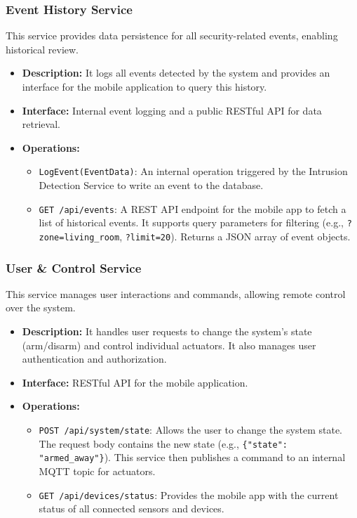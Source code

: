 \documentclass[conference]{IEEEtran}
\begin{document}
\subsubsection{Event History Service}
This service provides data persistence for all security-related events, enabling historical review.
\begin{itemize}
    \item \textbf{Description:} It logs all events detected by the system and provides an interface for the mobile application to query this history.
    \item \textbf{Interface:} Internal event logging and a public RESTful API for data retrieval.
    \item \textbf{Operations:}
    \begin{itemize}
        \item \texttt{LogEvent(EventData)}: An internal operation triggered by the Intrusion Detection Service to write an event to the database.
        \item \texttt{GET /api/events}: A REST API endpoint for the mobile app to fetch a list of historical events. It supports query parameters for filtering (e.g., \texttt{?zone=living\_room}, \texttt{?limit=20}). Returns a JSON array of event objects.
    \end{itemize}
\end{itemize}

\subsubsection{User \& Control Service}
This service manages user interactions and commands, allowing remote control over the system.
\begin{itemize}
    \item \textbf{Description:} It handles user requests to change the system's state (arm/disarm) and control individual actuators. It also manages user authentication and authorization.
    \item \textbf{Interface:} RESTful API for the mobile application.
    \item \textbf{Operations:}
    \begin{itemize}
        \item \texttt{POST /api/system/state}: Allows the user to change the system state. The request body contains the new state (e.g., \texttt{\{"state": "armed\_away"\}}). This service then publishes a command to an internal MQTT topic for actuators.
        \item \texttt{GET /api/devices/status}: Provides the mobile app with the current status of all connected sensors and devices.
    \end{itemize}
\end{itemize}
\end{document}
